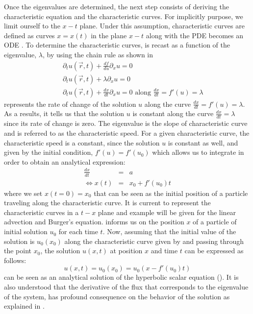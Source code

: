 Once the eigenvalues are determined, the next step consists of deriving the characteristic equation and the characteristic curves. For implicitly purpose, we limit ourself to the $x-t$ plane. Under this assumption, characteristic curves are defined as curves $x = x(t)$ in the plane $x-t$ along with the PDE becomes an ODE \cite{Toro}. To determine the characteristic curves,  is recast as a function of the eigenvalue, $\lambda$, by using the chain rule as shown in 
%
\begin{eqnarray}\label{eq:ivp3_sct1b}
&&\partial_t u(\vec{r},t) + \frac{df}{du}\partial_x u = 0 \nonumber\\
&&\partial_t u(\vec{r},t) + \lambda \partial_x u = 0 \nonumber \\
&&\partial_t u(\vec{r},t) + \frac{dx}{dt} \partial_x u = 0 \text{ along } \frac{dx}{dt} = f'(u) = \lambda 
\end{eqnarray}
%
 represents the rate of change of the solution $u$ along the curve $\frac{dx}{dt} = f'(u) = \lambda$. As a results, it tells us that the solution $u$ is constant along the curve $\frac{dx}{dt} = \lambda$ since its rate of change is zero. The eigenvalue is the slope of characteristic curve and is referred to as the characteristic speed. 
For a given characteristic curve, the characteristic speed is a constant, since the solution $u$ is constant as well, and given by the initial condition, $f'(u)=f'(u_0)$ which allows us to integrate in order to obtain an analytical expression:
%
\begin{eqnarray}\label{eq:ivp4_sct1b}
\frac{dx}{dt} &=& a \nonumber \\
\Leftrightarrow x(t) &=& x_0 + f'(u_0)t
\end{eqnarray}
%
where we set $x(t=0) = x_0$ that can be seen as the initial position of a particle traveling along the characteristic curve. It is current to represent the characteristic curves in a $t-x$ plane and example will be given for the linear advection and Burger's equation.  informs us on the position $x$ of a particle of initial solution $u_0$ for each time $t$. Now, assuming that the initial value of the solution is $u_0(x_0)$ along the characteristic curve given by  and passing through the point $x_0$, the solution $u(x,t)$ at position $x$ and time $t$ can be expressed as follows:
%
\begin{equation}\label{eq:ivp5_sct1b}
u(x,t) = u_0(x_0) = u_0(x - f'(u_0)t)
\end{equation}
%
\label{eq:ivp5_sct1b} can be seen as an analytical solution of the hyperbolic scalar equation (). It is also understood that the derivative of the flux that corresponds to the eigenvalue of the system, has profound consequence on the behavior of the solution as explained in . 
